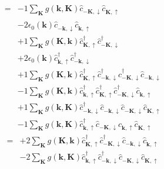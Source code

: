 \begin{align*}
	[H, c_{-k \downarrow } c_{k \uparrow } + c_{k \uparrow}^\dagger c_{-k \downarrow}^\dagger ] = 	&-1 \sum_{ \mathbf{K} } g( \mathbf{k}, \mathbf{K} )   \hat{c}_{ -\mathbf{K}, \downarrow }^{\phantom{\dagger}} \hat{c}_{ \mathbf{K}, \uparrow }^{\phantom{\dagger}}  \\
	&-2 \epsilon_0( \mathbf{k} )   \hat{c}_{ -\mathbf{k}, \downarrow }^{\phantom{\dagger}} \hat{c}_{ \mathbf{k}, \uparrow }^{\phantom{\dagger}}  \\
	&+1 \sum_{ \mathbf{K} } g( \mathbf{K}, \mathbf{k} )   \hat{c}_{ \mathbf{K}, \uparrow }^\dagger  \hat{c}_{ -\mathbf{K}, \downarrow }^\dagger   \\
	&+2 \epsilon_0( \mathbf{k} )   \hat{c}_{ \mathbf{k}, \uparrow }^\dagger  \hat{c}_{ -\mathbf{k}, \downarrow }^\dagger   \\
	&+1 \sum_{ \mathbf{K} } g( \mathbf{K}, \mathbf{k} )   \hat{c}_{ \mathbf{K}, \uparrow }^\dagger  \hat{c}_{ -\mathbf{k}, \downarrow }^\dagger  \hat{c}_{ -\mathbf{K}, \downarrow }^\dagger  \hat{c}_{ -\mathbf{k}, \downarrow }^{\phantom{\dagger}}  \\
	&-1 \sum_{ \mathbf{K} } g( \mathbf{K}, \mathbf{k} )   \hat{c}_{ \mathbf{k}, \uparrow }^\dagger  \hat{c}_{ \mathbf{K}, \uparrow }^\dagger  \hat{c}_{ -\mathbf{K}, \downarrow }^\dagger  \hat{c}_{ \mathbf{k}, \uparrow }^{\phantom{\dagger}}  \\
	&+1 \sum_{ \mathbf{K} } g( \mathbf{k}, \mathbf{K} )   \hat{c}_{ -\mathbf{k}, \downarrow }^\dagger  \hat{c}_{ -\mathbf{k}, \downarrow }^{\phantom{\dagger}} \hat{c}_{ -\mathbf{K}, \downarrow }^{\phantom{\dagger}} \hat{c}_{ \mathbf{K}, \uparrow }^{\phantom{\dagger}}  \\
	&-1 \sum_{ \mathbf{K} } g( \mathbf{k}, \mathbf{K} )   \hat{c}_{ \mathbf{k}, \uparrow }^\dagger  \hat{c}_{ -\mathbf{K}, \downarrow }^{\phantom{\dagger}} \hat{c}_{ \mathbf{k}, \uparrow }^{\phantom{\dagger}} \hat{c}_{ \mathbf{K}, \uparrow }^{\phantom{\dagger}} 
\end{align*}
\begin{align*}
	[H, c_{k \uparrow}^\dagger c_{k \uparrow } + c_{-k \downarrow}^\dagger c_{-k \downarrow} ] = 	&+2 \sum_{ \mathbf{K} } g( \mathbf{K}, \mathbf{k} )   \hat{c}_{ \mathbf{K}, \uparrow }^\dagger  \hat{c}_{ -\mathbf{K}, \downarrow }^\dagger  \hat{c}_{ -\mathbf{k}, \downarrow }^{\phantom{\dagger}} \hat{c}_{ \mathbf{k}, \uparrow }^{\phantom{\dagger}}  \\
	&-2 \sum_{ \mathbf{K} } g( \mathbf{k}, \mathbf{K} )   \hat{c}_{ \mathbf{k}, \uparrow }^\dagger  \hat{c}_{ -\mathbf{k}, \downarrow }^\dagger  \hat{c}_{ -\mathbf{K}, \downarrow }^{\phantom{\dagger}} \hat{c}_{ \mathbf{K}, \uparrow }^{\phantom{\dagger}} 
\end{align*}
